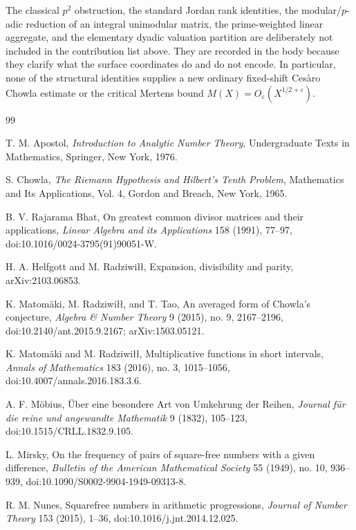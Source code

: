 \documentclass[11pt]{amsart}
\numberwithin{equation}{section}
\theoremstyle{plain}
\theoremstyle{definition}
\theoremstyle{remark}
\newcommand{\eps}{\varepsilon}
\begin{document}
The classical $p^2$ obstruction, the standard Jordan rank identities, the modular/$p$-adic reduction of an integral unimodular matrix, the prime-weighted linear aggregate, and the elementary dyadic valuation partition are deliberately not included in the contribution list above.  They are recorded in the body because they clarify what the surface coordinates do and do not encode.  In particular, none of the structural identities supplies a new ordinary fixed-shift Cesàro Chowla estimate or the critical Mertens bound $M(X)=O_\eps(X^{1/2+\eps})$.

\begin{thebibliography}{99}

T. M. Apostol,
\emph{Introduction to Analytic Number Theory},
Undergraduate Texts in Mathematics, Springer, New York, 1976.

S. Chowla,
\emph{The Riemann Hypothesis and Hilbert's Tenth Problem},
Mathematics and Its Applications, Vol. 4, Gordon and Breach, New York, 1965.

B. V. Rajarama Bhat,
On greatest common divisor matrices and their applications,
\emph{Linear Algebra and its Applications} 158 (1991), 77--97,
doi:10.1016/0024-3795(91)90051-W.

H. A. Helfgott and M. Radziwi{\l}{\l},
Expansion, divisibility and parity,
arXiv:2103.06853.

K. Matomäki, M. Radziwi{\l}{\l}, and T. Tao,
An averaged form of Chowla's conjecture,
\emph{Algebra \& Number Theory} 9 (2015), no. 9, 2167--2196,
doi:10.2140/ant.2015.9.2167; arXiv:1503.05121.

K. Matomäki and M. Radziwi{\l}{\l},
Multiplicative functions in short intervals,
\emph{Annals of Mathematics} 183 (2016), no. 3, 1015--1056,
doi:10.4007/annals.2016.183.3.6.

A. F. Möbius,
Über eine besondere Art von Umkehrung der Reihen,
\emph{Journal für die reine und angewandte Mathematik} 9 (1832), 105--123,
doi:10.1515/CRLL.1832.9.105.

L. Mirsky,
On the frequency of pairs of square-free numbers with a given difference,
\emph{Bulletin of the American Mathematical Society} 55 (1949), no. 10, 936--939,
doi:10.1090/S0002-9904-1949-09313-8.

R. M. Nunes,
Squarefree numbers in arithmetic progressions,
\emph{Journal of Number Theory} 153 (2015), 1--36,
doi:10.1016/j.jnt.2014.12.025.


\end{thebibliography}
\end{document}
